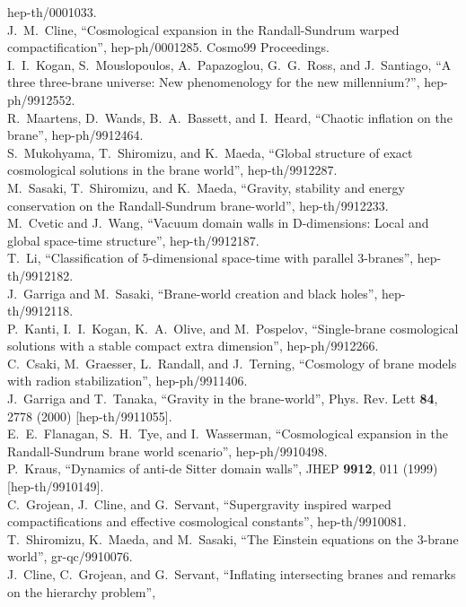 \documentclass[a4paper,12pt]{article}
\begin{document}
\begin{thebibliography}{99}
hep-th/0001033.
\\
J.~M.~Cline,
``Cosmological expansion in the Randall-Sundrum warped compactification'',
hep-ph/0001285.
Cosmo99 Proceedings.
\\
I.~I.~Kogan, S.~Mouslopoulos, A.~Papazoglou, G.~G.~Ross, and J.~Santiago,
``A three three-brane universe: New phenomenology for the new millennium?'',
hep-ph/9912552.
\\
R.~Maartens, D.~Wands, B.~A.~Bassett, and I.~Heard,
``Chaotic inflation on the brane'',
hep-ph/9912464.
\\
S.~Mukohyama, T.~Shiromizu, and K.~Maeda,
``Global structure of exact cosmological solutions in the brane world'',
hep-th/9912287.
\\
M.~Sasaki, T.~Shiromizu, and K.~Maeda,
``Gravity, stability and energy conservation on the Randall-Sundrum  brane-world'',
hep-th/9912233.
\\
M.~Cvetic and J.~Wang,
``Vacuum domain walls in D-dimensions: Local and global space-time  structure'',
hep-th/9912187.
\\
T.~Li,
``Classification of 5-dimensional space-time with parallel 3-branes'',
hep-th/9912182.
\\
J.~Garriga and M.~Sasaki,
``Brane-world creation and black holes'',
hep-th/9912118.
\\
P.~Kanti, I.~I.~Kogan, K.~A.~Olive, and M.~Pospelov,
``Single-brane cosmological solutions with a stable compact extra  dimension'',
hep-ph/9912266.
\\
C.~Csaki, M.~Graesser, L.~Randall, and J.~Terning,
``Cosmology of brane models with radion stabilization'',
hep-ph/9911406.
\\
J.~Garriga and T.~Tanaka,
``Gravity in the brane-world'',
Phys. Rev. Lett {\bf 84}, 2778 (2000)
[hep-th/9911055].
\\
E.~E.~Flanagan, S.~H.~Tye, and I.~Wasserman,
``Cosmological expansion in the Randall-Sundrum brane world scenario'',
hep-ph/9910498.
\\
P.~Kraus,
``Dynamics of anti-de Sitter domain walls'',
JHEP {\bf 9912}, 011 (1999)
[hep-th/9910149].
\\
C.~Grojean, J.~Cline, and G.~Servant,
``Supergravity inspired warped compactifications and effective  
cosmological constants'',
hep-th/9910081.
\\
T.~Shiromizu, K.~Maeda, and M.~Sasaki,
``The Einstein equations on the 3-brane world'',
gr-qc/9910076.
\\
J.~Cline, C.~Grojean, and G.~Servant,
``Inflating intersecting branes and remarks on the hierarchy problem'',

\end{thebibliography}
\end{document}
